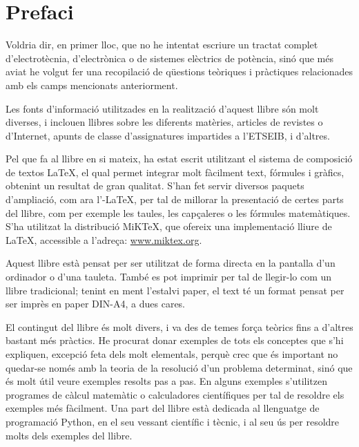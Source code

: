 \chapter*{Prefaci} 

   Voldria dir, en primer lloc, que no he intentat escriure un tractat complet
   d'electrotècnia, d'electrònica o de sistemes elèctrics de potència, sinó que més aviat
   he volgut
   fer una recopilació de qüestions teòriques i pràctiques relacionades amb els camps mencionats
   anteriorment.

   Les fonts d'informació utilitzades en la realització d'aquest llibre són molt diverses,
   i inclouen llibres sobre les diferents matèries, articles de revistes o d'Internet,
   apunts de classe d'assignatures impartides a l'ETSEIB, i d'altres.

   Pel que fa al llibre en si mateix, ha estat escrit utilitzant el sistema de composició de
   textos \LaTeX, el qual
   permet integrar molt fàcilment text, fórmules i gràfics, obtenint un resultat de
   gran qualitat. S'han fet servir diversos paquets d'ampliació, com ara
   l'\AmS-\LaTeX,
   per tal de millorar la presentació de certes parts del
   llibre, com per exemple les taules, les capçaleres o les fórmules matemàtiques. S'ha utilitzat la distribució MiK\TeX, que ofereix una implementació lliure de \LaTeX{}, accessible a l'adreça: \href{http://www.miktex.org/}{www.miktex.org}.

   Aquest llibre està pensat per  ser utilitzat  de forma directa en la pantalla d'un
   ordinador o d'una tauleta. També es pot imprimir per tal de llegir-lo com un llibre tradicional;  tenint en ment l'estalvi paper, el text
   té un format pensat per  ser imprès en paper DIN-A4, a dues cares.

    El contingut del llibre és molt divers, i va des de temes força teòrics fins a
    d'altres bastant més pràctics. He procurat donar exemples de tots els conceptes
    que s'hi expliquen, excepció feta dels molt elementals, perquè crec que és important
     no quedar-se només amb la teoria de  la resolució d'un problema determinat, sinó que
     és molt útil veure exemples resolts pas a pas. En alguns exemples s'utilitzen programes de càlcul matemàtic o calculadores científiques per tal de resoldre els exemples més fàcilment. Una part  del llibre està dedicada al llenguatge de programació Python, en el seu vessant científic i tècnic, i al seu ús  per resoldre molts dels exemples del llibre.
     
